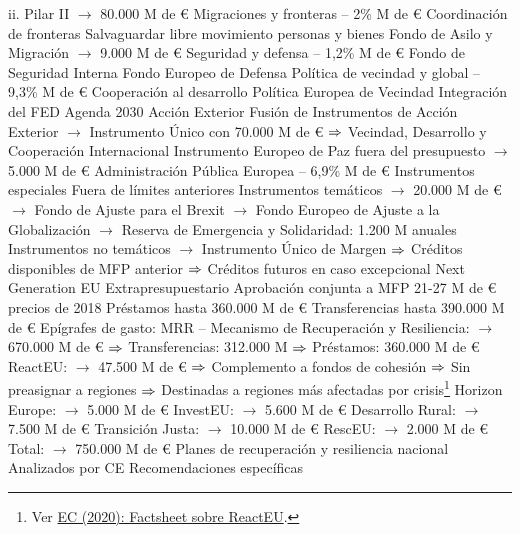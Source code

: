 \documentclass{nuevotema}
\begin{document}
\begin{esquemal}
				\4[] ii. Pilar II
				\4[] $\to$ 80.000 M de €
			\3[4] Migraciones y fronteras -- 2\%
				 M de €
				\4[] Coordinación de fronteras
				\4[] Salvaguardar libre movimiento personas y bienes
				\4[] Fondo de Asilo y Migración
				\4[] $\to$ 9.000 M de €
			\3[5] Seguridad y defensa -- 1,2\%
				 M de €
				\4[] Fondo de Seguridad Interna
				\4[] Fondo Europeo de Defensa
			\3[6] Política de vecindad y global -- 9,3\%
				 M de €
				\4[] Cooperación al desarrollo
				\4[] Política Europea de Vecindad
				\4[] Integración del FED
				\4[] Agenda 2030
				\4[] Acción Exterior
				\4[] Fusión de Instrumentos de Acción Exterior
				\4[] $\to$ Instrumento Único con 70.000 M de €
				\4[] $\Rightarrow$ Vecindad, Desarrollo y Cooperación Internacional
				\4[] Instrumento Europeo de Paz fuera del presupuesto
				\4[] $\to$ 5.000 M de €
			\3[7] Administración Pública Europea -- 6,9\%
				 M de €
			\3[] Instrumentos especiales
				\4 Fuera de límites anteriores
				\4[] Instrumentos temáticos
				\4[] $\to$ 20.000 M de €
				\4[] $\to$ Fondo de Ajuste para el Brexit
				\4[] $\to$ Fondo Europeo de Ajuste a la Globalización
				\4[] $\to$ Reserva de Emergencia y Solidaridad: 1.200 M anuales
				\4 Instrumentos no temáticos
				\4[] $\to$ Instrumento Único de Margen
				\4[] $\Rightarrow$ Créditos disponibles de MFP anterior
				\4[] $\Rightarrow$ Créditos futuros en caso excepcional
			\3 Next Generation EU
				\4 Extrapresupuestario
				\4 Aprobación conjunta a MFP 21-27
				 M de € precios de 2018
				\4 Préstamos hasta 360.000 M de €
				\4 Transferencias hasta 390.000 M de €
				\4 Epígrafes de gasto:
				\4[] MRR -- Mecanismo de Recuperación y Resiliencia:
				\4[] $\to$ 670.000 M de €
				\4[] $\Rightarrow$ Transferencias: 312.000 M
				\4[] $\Rightarrow$ Préstamos: 360.000 M de €
				\4[] ReactEU:
				\4[] $\to$ 47.500 M de €
				\4[] $\Rightarrow$ Complemento a fondos de cohesión
				\4[] $\Rightarrow$ Sin preasignar a regiones
				\4[] $\Rightarrow$ Destinadas a regiones más afectadas por crisis\footnote{Ver \href{https://ec.europa.eu/regional_policy/sources/docgener/factsheet/2020_mff_reacteu_en.pdf}{EC (2020): Factsheet sobre ReactEU}.}
				\4[] Horizon Europe:
				\4[] $\to$ 5.000 M de €
				\4[] InvestEU:
				\4[] $\to$ 5.600 M de €
				\4[] Desarrollo Rural:
				\4[] $\to$ 7.500 M de €
				\4[] Transición Justa:
				\4[] $\to$ 10.000 M de €
				\4[] RescEU:
				\4[] $\to$ 2.000 M de €
				\4[] Total:
				\4[] $\to$ 750.000 M de €
				\4 Planes de recuperación y resiliencia nacional
				\4[] Analizados por CE
				\4[] Recomendaciones específicas

\end{esquemal}
\end{document}
